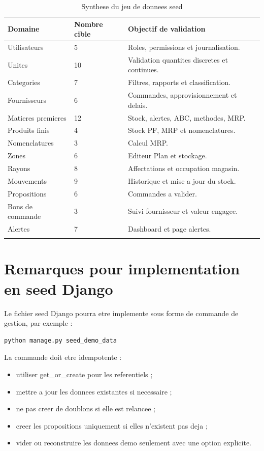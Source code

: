 \documentclass[11pt,a4paper]{article}
\begin{document}
\begin{longtable}{|p{5cm}|p{3cm}|p{6cm}|}
\hline
\textbf{Domaine} & \textbf{Nombre cible} & \textbf{Objectif de validation} \\
\hline
Utilisateurs & 5 & Roles, permissions et journalisation. \\
\hline
Unites & 10 & Validation quantites discretes et continues. \\
\hline
Categories & 7 & Filtres, rapports et classification. \\
\hline
Fournisseurs & 6 & Commandes, approvisionnement et delais. \\
\hline
Matieres premieres & 12 & Stock, alertes, ABC, methodes, MRP. \\
\hline
Produits finis & 4 & Stock PF, MRP et nomenclatures. \\
\hline
Nomenclatures & 3 & Calcul MRP. \\
\hline
Zones & 6 & Editeur Plan et stockage. \\
\hline
Rayons & 8 & Affectations et occupation magasin. \\
\hline
Mouvements & 9 & Historique et mise a jour du stock. \\
\hline
Propositions & 6 & Commandes a valider. \\
\hline
Bons de commande & 3 & Suivi fournisseur et valeur engagee. \\
\hline
Alertes & 7 & Dashboard et page alertes. \\
\hline
\caption{Synthese du jeu de donnees seed}
\end{longtable}

\section{Remarques pour implementation en seed Django}

Le fichier seed Django pourra etre implemente sous forme de commande de gestion, par exemple :

\begin{verbatim}
python manage.py seed_demo_data
\end{verbatim}

La commande doit etre idempotente :
\begin{itemize}
  \item utiliser get\_or\_create pour les referentiels ;
  \item mettre a jour les donnees existantes si necessaire ;
  \item ne pas creer de doublons si elle est relancee ;
  \item creer les propositions uniquement si elles n'existent pas deja ;
  \item vider ou reconstruire les donnees demo seulement avec une option explicite.
\end{itemize}
\end{document}
